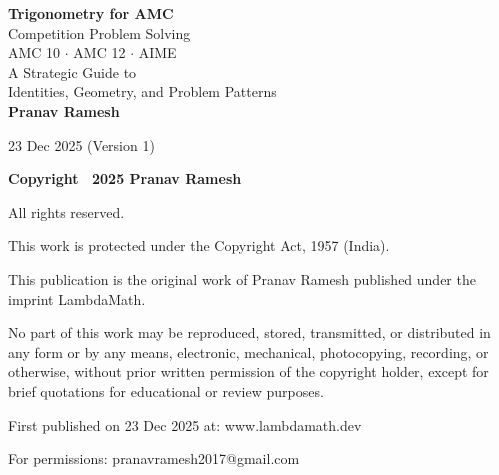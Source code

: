 \documentclass[12pt]{extarticle}
\begin{document}
\begin{titlepage}
\centering
\vspace*{2cm}

{\Huge\bfseries Trigonometry for AMC}\\[0.5cm]
{\Large Competition Problem Solving}\\[2cm]

{\large AMC 10 $\cdot$ AMC 12 $\cdot$ AIME}\\[3cm]

{\Large A Strategic Guide to\\[0.3cm]
Identities, Geometry, and Problem Patterns}\\[3cm]

{\Large\textbf{Pranav Ramesh}}\\[3cm]

\vfill

{\large 23 Dec 2025 (Version 1)}
\end{titlepage}

\thispagestyle{empty}
\vspace*{\fill}
\begin{center}
\textbf{\Large Copyright \textcopyright\ 2025 Pranav Ramesh}

All rights reserved.

This work is protected under the Copyright Act, 1957 (India).

\vspace{1.5cm}

This publication is the original work of Pranav Ramesh published under the imprint LambdaMath.

\vspace{1.5cm}

No part of this work may be reproduced, stored, transmitted, or distributed in any form or by any means, electronic, mechanical, photocopying, recording, or otherwise, without prior written permission of the copyright holder, except for brief quotations for educational or review purposes.

\vspace{1.5cm}

First published on 23 Dec 2025 at: www{.}lambdamath{.}dev

For permissions: pranavramesh2017@gmail{.}com
\end{center}
\vspace*{\fill}

\newpage
\end{document}
